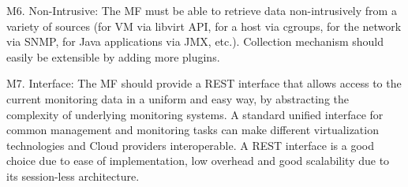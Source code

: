 M6. Non-Intrusive: The MF must be able to retrieve data non-intrusively from a variety of sources (for VM via libvirt API, for a host via cgroups, for the network via SNMP, for Java applications via JMX, etc.). Collection mechanism should easily be extensible by adding more plugins. 

M7. Interface: The MF should provide a REST interface that allows access to the current monitoring data in a uniform and easy way, by abstracting the complexity of underlying monitoring systems. A standard unified interface for common management and monitoring tasks can make different virtualization technologies and Cloud providers interoperable. A REST interface is a good choice due to ease of implementation, low overhead and good scalability due to its session-less architecture.